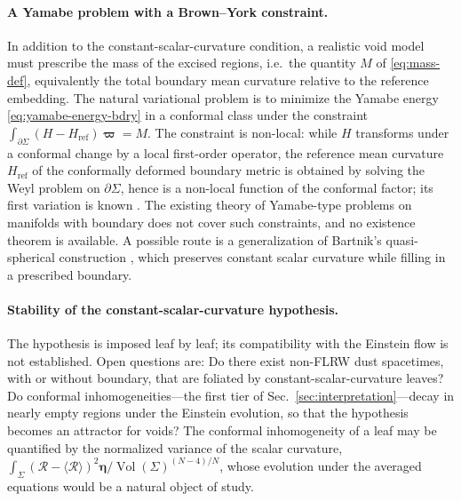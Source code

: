 \documentclass[aps,prd,reprint,amsmath,amssymb,nofootinbib,longbibliography]{revtex4-2}
\DeclareMathOperator{\Vol}{Vol}
\newcommand{\Rs}{\mathcal{R}}               %
\newcommand{\vol}{\boldsymbol{\eta}}        %
\newcommand{\bvol}{\boldsymbol{\varpi}}     %
\newcommand{\Href}{H_{\mathrm{ref}}}
\theoremstyle{plain}
\theoremstyle{definition}
\theoremstyle{remark}
\begin{document}
\paragraph*{A Yamabe problem with a Brown--York constraint.}
In addition to the constant-scalar-curvature condition, a realistic void model must prescribe the mass of the excised regions, i.e.\ the quantity $M$ of \eqref{eq:mass-def}, equivalently the total boundary mean curvature relative to the reference embedding. The natural variational problem is to minimize the Yamabe energy \eqref{eq:yamabe-energy-bdry} in a conformal class under the constraint $\int_{\partial\Sigma}(H-\Href)\bvol=M$. The constraint is non-local: while $H$ transforms under a conformal change by a local first-order operator, the reference mean curvature $\Href$ of the conformally deformed boundary metric is obtained by solving the Weyl problem on $\partial\Sigma$, hence is a non-local function of the conformal factor; its first variation is known \cite{MR2504860}. The existing theory of Yamabe-type problems on manifolds with boundary \cite{MR625363,MR1152225,MR1173925,MR1444473,MR1990532,MR1416000,MR1712631,MR1792375,MR2189679,MR3210959,MR4097243,MR3781875,MR4011798} does not cover such constraints, and no existence theorem is available. A possible route is a generalization of Bartnik's quasi-spherical construction \cite{MR1198599}, which preserves constant scalar curvature while filling in a prescribed boundary.

\paragraph*{Stability of the constant-scalar-curvature hypothesis.}
The hypothesis is imposed leaf by leaf; its compatibility with the Einstein flow is not established. Open questions are: Do there exist non-FLRW dust spacetimes, with or without boundary, that are foliated by constant-scalar-curvature leaves? Do conformal inhomogeneities---the first tier of Sec.~\ref{sec:interpretation}---decay in nearly empty regions under the Einstein evolution, so that the hypothesis becomes an attractor for voids? The conformal inhomogeneity of a leaf may be quantified by the normalized variance of the scalar curvature, $\int_\Sigma(\Rs-\langle\Rs\rangle)^2\vol/\Vol(\Sigma)^{(N-4)/N}$, whose evolution under the averaged equations would be a natural object of study.
\end{document}
